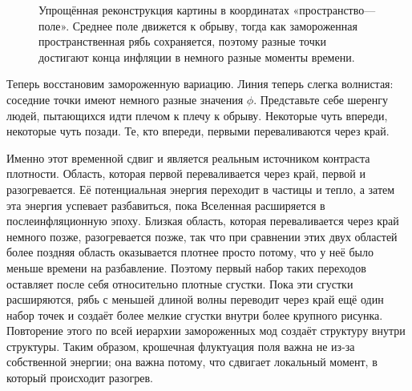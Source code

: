 \begin{figure}[htbp]
\centering
\begin{coursefitfigure}
\end{coursefitfigure}
\caption{Упрощённая реконструкция картины в координатах «пространство—поле». Среднее поле движется к обрыву, тогда как замороженная пространственная рябь сохраняется, поэтому разные точки достигают конца инфляции в немного разные моменты времени.}
\label{fig:c10-cliff-reconstruction}
\end{figure}

Теперь восстановим замороженную вариацию. Линия теперь слегка волнистая: соседние точки имеют немного разные значения \(\phi\). Представьте себе шеренгу людей, пытающихся идти плечом к плечу к обрыву. Некоторые чуть впереди, некоторые чуть позади. Те, кто впереди, первыми переваливаются через край.

Именно этот временной сдвиг и является реальным источником контраста плотности. Область, которая первой переваливается через край, первой и разогревается. Её потенциальная энергия переходит в частицы и тепло, а затем эта энергия успевает разбавиться, пока Вселенная расширяется в послеинфляционную эпоху. Близкая область, которая переваливается через край немного позже, разогревается позже, так что при сравнении этих двух областей более поздняя область оказывается плотнее просто потому, что у неё было меньше времени на разбавление. Поэтому первый набор таких переходов оставляет после себя относительно плотные сгустки. Пока эти сгустки расширяются, рябь с меньшей длиной волны переводит через край ещё один набор точек и создаёт более мелкие сгустки внутри более крупного рисунка. Повторение этого по всей иерархии замороженных мод создаёт структуру внутри структуры. Таким образом, крошечная флуктуация поля важна не из-за собственной энергии; она важна потому, что сдвигает локальный момент, в который происходит разогрев.

